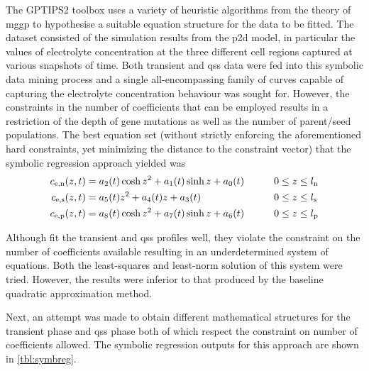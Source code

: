 The GPTIPS2  toolbox uses a variety  of heuristic algorithms from  the theory of
\gls{mggp}  to hypothesise  a suitable  equation structure  for the  data to  be
fitted.  The dataset  consisted of  the  simulation results  from the  \gls{p2d}
model,  in particular  the  values  of electrolyte  concentration  at the  three
different cell  regions captured  at various snapshots  of time.  Both transient
and  \gls{qss} data  were  fed into  this  symbolic data  mining  process and  a
single all-encompassing  family of curves  capable of capturing  the electrolyte
concentration behaviour was  sought for. However, the constraints  in the number
of coefficients that  can be employed results  in a restriction of  the depth of
gene  mutations as  well  as the  number of  parent/seed  populations. The  best
equation set  (without strictly  enforcing the aforementioned  hard constraints,
yet  minimizing  the  distance  to  the constraint  vector)  that  the  symbolic
regression approach yielded was
\begin{alignat}{2}
    c_{\text{e,n}}(z,t) & = a_2(t) \cosh z^2 + a_1(t) \sinh z + a_0(t) \qquad &  & 0 \le z \le l_\text{n} \label{eq:cnstrviolneg} \\
    c_{\text{e,s}}(z,t) & = a_5(t) z^2 + a_4(t) z + a_3(t) \qquad             &  & 0 \le z \le l_\text{s}                         \\
    c_{\text{e,p}}(z,t) & = a_8(t) \cosh z^2 + a_7(t) \sinh z + a_6(t) \qquad &  & 0 \le z \le l_\text{p}\label{eq:cnstrviolpos}
\end{alignat}

Although   fit   the  transient  and
\gls{qss}  profiles  well,  they  violate   the  constraint  on  the  number  of
coefficients  available resulting  in  an underdetermined  system of  equations.
Both  the least-squares  and  least-norm  solution of  this  system were  tried.
However, the  results were inferior to  that produced by the  baseline quadratic
approximation method.

Next, an  attempt was made to  obtain different mathematical structures  for the
transient phase  and \gls{qss}  phase both  of which  respect the  constraint on
number  of  coefficients  allowed.  The symbolic  regression  outputs  for  this
approach are shown in \cref{tbl:symbreg}.


